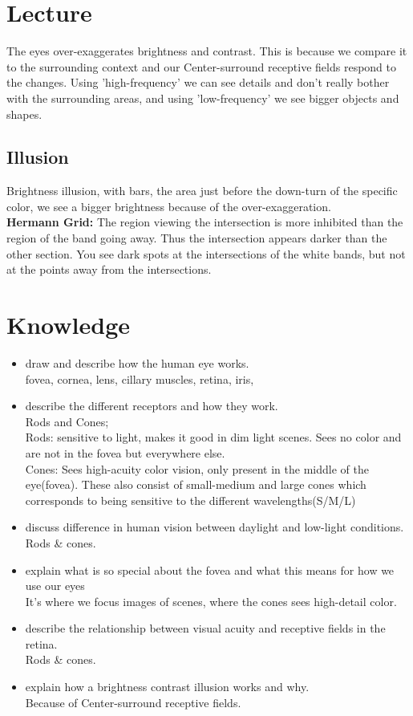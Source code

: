 \documentclass{article}
\begin{document}
\section{Lecture}
The eyes over-exaggerates brightness and contrast. This is because we compare it to the surrounding context and our Center-surround receptive fields respond to the changes.
Using 'high-frequency' we can see details and don't really bother with the surrounding areas, and using 'low-frequency' we see bigger objects and shapes.\\
\subsection{Illusion}
Brightness illusion, with bars, the area just before the down-turn of the specific color, we see a bigger brightness because of the over-exaggeration.\\
\textbf{Hermann Grid:}
The region viewing the intersection is more inhibited than the region of the band going away. Thus the intersection appears darker than the other section. You see dark spots at the intersections of the white bands, but not at the points away from the intersections.\\
\section{Knowledge}
\begin{itemize}
  \item draw and describe how the human eye works.\\
    fovea, cornea, lens, cillary muscles, retina, iris, 
  \item describe the different receptors and how they work.\\
    Rods and Cones;\\
    Rods: sensitive to light, makes it good in dim light scenes. Sees no color and are not in the fovea but everywhere else.\\
    Cones: Sees high-acuity color vision, only present in the middle of the eye(fovea). These also consist of small-medium and large cones which corresponds to being sensitive to the different wavelengths(S/M/L)
  \item discuss difference in human vision between daylight and low-light conditions.\\
    Rods \& cones.\\
  \item explain what is so special about the fovea and what this means for how we use our eyes\\
    It's where we focus images of scenes, where the cones sees high-detail color.
  \item describe the relationship between visual acuity and receptive fields in the retina.\\
    Rods \& cones.\\
  \item explain how a brightness contrast illusion works and why.\\
    Because of Center-surround receptive fields.\\
\end{itemize}
\end{document}
